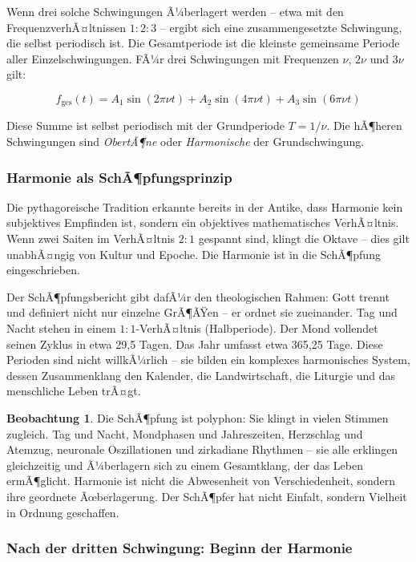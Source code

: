 ﻿\documentclass[a4paper,12pt]{article}
\theoremstyle{definition}
\newtheorem{observation}{Beobachtung}[section]
\begin{document}
Wenn drei solche Schwingungen Ã¼berlagert werden -- etwa mit den FrequenzverhÃ¤ltnissen
$1 : 2 : 3$ -- ergibt sich eine zusammengesetzte Schwingung, die selbst periodisch
ist. Die Gesamtperiode ist die kleinste gemeinsame Periode aller Einzelschwingungen.
FÃ¼r drei Schwingungen mit Frequenzen $\nu$, $2\nu$ und $3\nu$ gilt:

\begin{equation}
	f_{\text{ges}}(t) = A_1 \sin(2\pi\nu t) + A_2 \sin(4\pi\nu t) + A_3 \sin(6\pi\nu t)
\end{equation}

Diese Summe ist selbst periodisch mit der Grundperiode $T = 1/\nu$. Die hÃ¶heren
Schwingungen sind \textit{ObertÃ¶ne} oder \textit{Harmonische} der Grundschwingung.

\subsubsection{Harmonie als SchÃ¶pfungsprinzip}

Die pythagoreische Tradition erkannte bereits in der Antike, dass Harmonie kein
subjektives Empfinden ist, sondern ein objektives mathematisches VerhÃ¤ltnis. Wenn
zwei Saiten im VerhÃ¤ltnis $2:1$ gespannt sind, klingt die Oktave -- dies gilt
unabhÃ¤ngig von Kultur und Epoche. Die Harmonie ist in die SchÃ¶pfung eingeschrieben.

Der SchÃ¶pfungsbericht gibt dafÃ¼r den theologischen Rahmen: Gott trennt und
definiert nicht nur einzelne GrÃ¶ÃŸen -- er ordnet sie zueinander. Tag und Nacht
stehen in einem $1:1$-VerhÃ¤ltnis (Halbperiode). Der Mond vollendet seinen Zyklus
in etwa 29,5 Tagen. Das Jahr umfasst etwa 365,25 Tage. Diese Perioden sind nicht
willkÃ¼rlich -- sie bilden ein komplexes harmonisches System, dessen Zusammenklang
den Kalender, die Landwirtschaft, die Liturgie und das menschliche Leben trÃ¤gt.

\begin{observation}
	Die SchÃ¶pfung ist polyphon: Sie klingt in vielen Stimmen zugleich. Tag und Nacht,
	Mondphasen und Jahreszeiten, Herzschlag und Atemzug, neuronale Oszillationen
	und zirkadiane Rhythmen -- sie alle erklingen gleichzeitig und Ã¼berlagern sich
	zu einem Gesamtklang, der das Leben ermÃ¶glicht. Harmonie ist nicht die Abwesenheit
	von Verschiedenheit, sondern ihre geordnete Ãœberlagerung. Der SchÃ¶pfer hat nicht
	Einfalt, sondern Vielheit in Ordnung geschaffen.
\end{observation}

\subsubsection{Nach der dritten Schwingung: Beginn der Harmonie}
\end{document}
